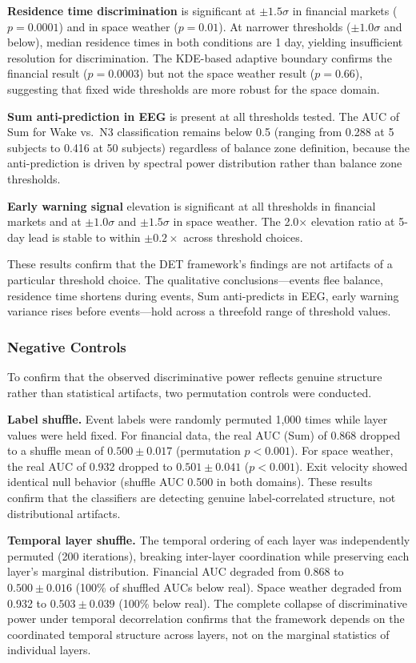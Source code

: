 \documentclass[12pt,a4paper]{article}
\begin{document}
\textbf{Residence time discrimination} is significant at $\pm 1.5\sigma$ in financial markets ($p = 0.0001$) and in space weather ($p = 0.01$). At narrower thresholds ($\pm 1.0\sigma$ and below), median residence times in both conditions are 1 day, yielding insufficient resolution for discrimination. The KDE-based adaptive boundary confirms the financial result ($p = 0.0003$) but not the space weather result ($p = 0.66$), suggesting that fixed wide thresholds are more robust for the space domain.

\textbf{Sum anti-prediction in EEG} is present at all thresholds tested. The AUC of Sum for Wake vs.\ N3 classification remains below 0.5 (ranging from 0.288 at 5 subjects to 0.416 at 50 subjects) regardless of balance zone definition, because the anti-prediction is driven by spectral power distribution rather than balance zone thresholds.

\textbf{Early warning signal} elevation is significant at all thresholds in financial markets and at $\pm 1.0\sigma$ and $\pm 1.5\sigma$ in space weather. The 2.0$\times$ elevation ratio at 5-day lead is stable to within $\pm 0.2\times$ across threshold choices.

These results confirm that the DET framework's findings are not artifacts of a particular threshold choice. The qualitative conclusions---events flee balance, residence time shortens during events, Sum anti-predicts in EEG, early warning variance rises before events---hold across a threefold range of threshold values.

\subsubsection{Negative Controls}

To confirm that the observed discriminative power reflects genuine structure rather than statistical artifacts, two permutation controls were conducted.

\textbf{Label shuffle.} Event labels were randomly permuted 1,000 times while layer values were held fixed. For financial data, the real AUC (Sum) of 0.868 dropped to a shuffle mean of $0.500 \pm 0.017$ (permutation $p < 0.001$). For space weather, the real AUC of 0.932 dropped to $0.501 \pm 0.041$ ($p < 0.001$). Exit velocity showed identical null behavior (shuffle AUC 0.500 in both domains). These results confirm that the classifiers are detecting genuine label-correlated structure, not distributional artifacts.

\textbf{Temporal layer shuffle.} The temporal ordering of each layer was independently permuted (200 iterations), breaking inter-layer coordination while preserving each layer's marginal distribution. Financial AUC degraded from 0.868 to $0.500 \pm 0.016$ (100\% of shuffled AUCs below real). Space weather degraded from 0.932 to $0.503 \pm 0.039$ (100\% below real). The complete collapse of discriminative power under temporal decorrelation confirms that the framework depends on the coordinated temporal structure across layers, not on the marginal statistics of individual layers.
\end{document}
